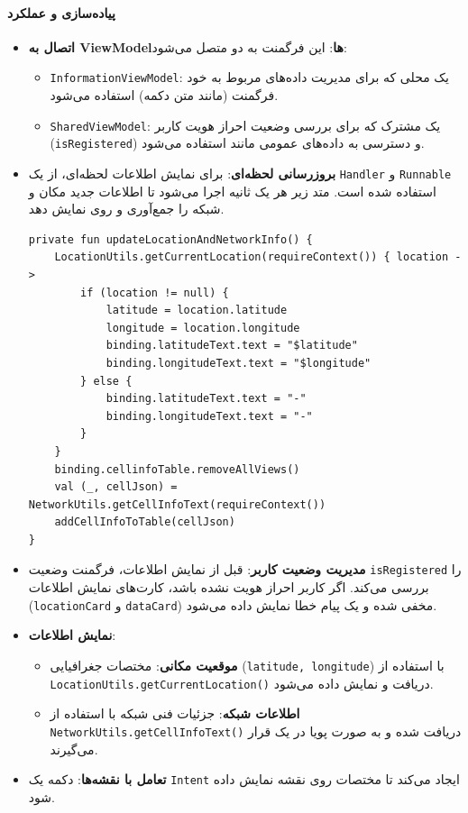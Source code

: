\documentclass{report}
\begin{document}
\paragraph{پیاده‌سازی و عملکرد}

\begin{itemize}
	\item \textbf{اتصال به ViewModelها}: این فرگمنت به دو  متصل می‌شود:
	\begin{itemize}
		\item \texttt{InformationViewModel}: یک  محلی که برای مدیریت داده‌های مربوط به خود فرگمنت (مانند متن دکمه) استفاده می‌شود.
		\item \texttt{SharedViewModel}: یک  مشترک که برای بررسی وضعیت احراز هویت کاربر (\texttt{isRegistered}) و دسترسی به داده‌های عمومی مانند  استفاده می‌شود.
	\end{itemize}
	
\item\textbf{بروزرسانی لحظه‌ای}: برای نمایش اطلاعات لحظه‌ای، از یک \texttt{Handler} و \texttt{Runnable} استفاده شده است. 
	متد زیر هر یک ثانیه اجرا می‌شود تا اطلاعات جدید مکان و شبکه را جمع‌آوری و روی  نمایش دهد.
	\begin{lstlisting}[mathescape=true]
private fun updateLocationAndNetworkInfo() {
	LocationUtils.getCurrentLocation(requireContext()) { location ->
		if (location != null) {
			latitude = location.latitude
			longitude = location.longitude
			binding.latitudeText.text = "$latitude"
			binding.longitudeText.text = "$longitude"
		} else {
			binding.latitudeText.text = "-"
			binding.longitudeText.text = "-"
		}
	}
	binding.cellinfoTable.removeAllViews()
	val (_, cellJson) = NetworkUtils.getCellInfoText(requireContext())
	addCellInfoToTable(cellJson)
}
	\end{lstlisting}

	
	\item \textbf{مدیریت وضعیت کاربر}: قبل از نمایش اطلاعات، فرگمنت وضعیت \texttt{isRegistered} را بررسی می‌کند. 
	اگر کاربر احراز هویت نشده باشد، کارت‌های نمایش اطلاعات (\texttt{locationCard} و \texttt{dataCard}) مخفی شده و یک پیام خطا نمایش داده می‌شود.
	
	\item \textbf{نمایش اطلاعات}:
	\begin{itemize}
		\item \textbf{موقعیت مکانی}: مختصات جغرافیایی (\texttt{latitude, longitude}) با استفاده از \texttt{LocationUtils.getCurrentLocation()} دریافت و نمایش داده می‌شود.
		\item \textbf{اطلاعات شبکه}: جزئیات فنی شبکه با استفاده از \texttt{NetworkUtils.getCellInfoText()} دریافت شده و به صورت پویا در یک  قرار می‌گیرند.
	\end{itemize}
	
	\item \textbf{تعامل با نقشه‌ها}: دکمه  یک \texttt{Intent} ایجاد می‌کند تا مختصات روی نقشه  نمایش داده شود.
\end{itemize}
\end{document}

